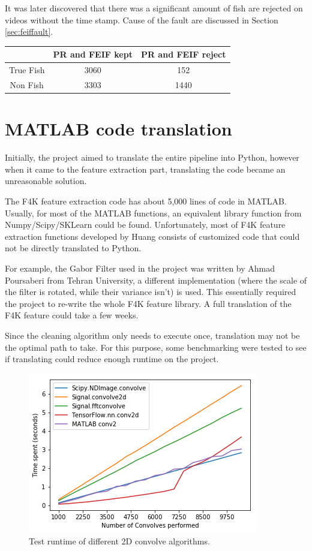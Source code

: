 \documentclass[bsc,logo,twoside,fullspacing,parskip]{infthesis}
\begin{document}
It was later discovered that there was a significant amount of fish are rejected on videos without the time stamp. Cause of the fault are discussed in Section \ref{sec:feiffault}.

\begin{center}
\begin{tabular}{|c|c|c|}
\hline 
$ $ & PR and FEIF kept & PR and FEIF reject \\
\hline 
True Fish & 3060 & 152 \\
Non Fish & 3303 & 1440 \\
\hline 
\end{tabular}
\end{center}

\section{MATLAB code translation}
\label{sec:translate}

Initially, the project aimed to translate the entire pipeline into Python, however when it came to the feature extraction part, translating the code became an unreasonable solution.

The F4K feature extraction code has about 5,000 lines of code in MATLAB.
Usually, for most of the MATLAB functions, an equivalent library function from Numpy/Scipy/SKLearn could be found.
Unfortunately, most of F4K feature extraction functions developed by Huang\cite{Huang} consists of customized code that could not be directly translated to Python.

For example, the Gabor Filter used in the project was written by Ahmad Poursaberi from Tehran University, a different implementation (where the scale of the filter is rotated, while their variance isn't) is used. 
This essentially required the project to re-write the whole F4K feature library.
A full translation of the F4K feature could take a few weeks. 

Since the cleaning algorithm only needs to execute once, translation may not be the optimal path to take. 
For this purpose, some benchmarking were tested to see if translating could reduce enough runtime on the project.

\begin{figure}[h]
    \centering
    \includegraphics[scale=0.5]{graph/benchmark.png}
    \caption{Test runtime of different 2D convolve algorithms.}
    \label{fig:benchmark}
\end{figure}
\end{document}
